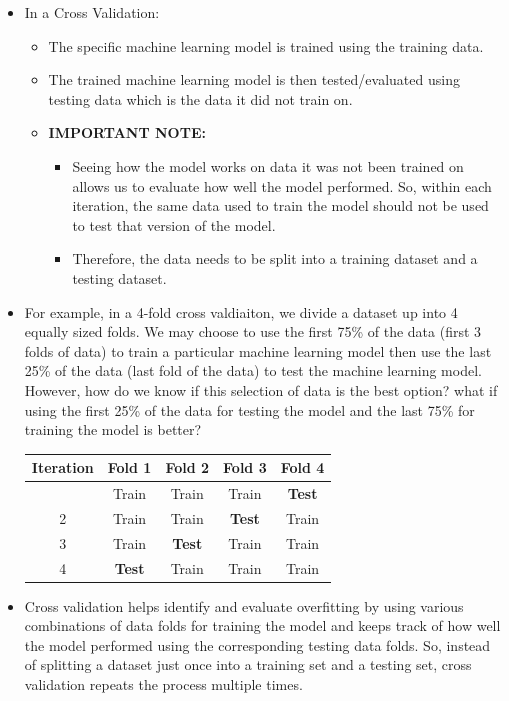 \documentclass[
  letterpaper,
  DIV=11,
  numbers=noendperiod]{scrreprt}
\newcounter{none} %
\providecommand{\tightlist}{%
  \setlength{\itemsep}{0pt}\setlength{\parskip}{0pt}}
\begin{document}
\begin{itemize}
\item
  In a Cross Validation:

  \begin{itemize}
  \tightlist
  \item
    The specific machine learning model is trained using the training
    data.
  \item
    The trained machine learning model is then tested/evaluated using
    testing data which is the data it did not train on.
  \item
    \textbf{IMPORTANT NOTE:}

    \begin{itemize}
    \tightlist
    \item
      Seeing how the model works on data it was not been trained on
      allows us to evaluate how well the model performed. So, within
      each iteration, the same data used to train the model should not
      be used to test that version of the model.
    \item
      Therefore, the data needs to be split into a training dataset and
      a testing dataset.
    \end{itemize}
  \end{itemize}
\item
  For example, in a 4-fold cross valdiaiton, we divide a dataset up into
  4 equally sized folds. We may choose to use the first 75\% of the data
  (first 3 folds of data) to train a particular machine learning model
  then use the last 25\% of the data (last fold of the data) to test the
  machine learning model. However, how do we know if this selection of
  data is the best option? what if using the first 25\% of the data for
  testing the model and the last 75\% for training the model is better?

  {\def\LTcaptype{none} %
  \begin{longtable}[]{@{}ccccc@{}}
  \toprule\noalign{}
  Iteration & Fold 1 & Fold 2 & Fold 3 & Fold 4 \\
  \midrule\noalign{}
  \endhead
  \bottomrule\noalign{}
  \endlastfoot
  1 & Train & Train & Train & \textbf{Test} \\
  2 & Train & Train & \textbf{Test} & Train \\
  3 & Train & \textbf{Test} & Train & Train \\
  4 & \textbf{Test} & Train & Train & Train \\
  \end{longtable}
  }
\item
  Cross validation helps identify and evaluate overfitting by using
  various combinations of data folds for training the model and keeps
  track of how well the model performed using the corresponding testing
  data folds. So, instead of splitting a dataset just once into a
  training set and a testing set, cross validation repeats the process
  multiple times.


\end{itemize}
\end{document}
